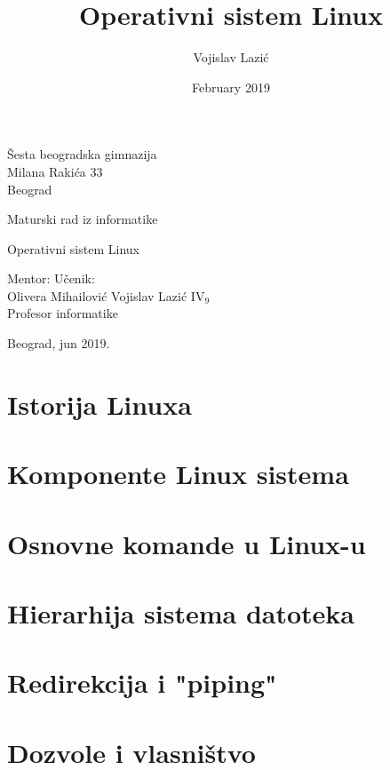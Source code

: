 \documentclass[12pt,twoside,a4paper]{article}
\title{Operativni sistem Linux}
\author{Vojislav Lazić}
\date{February 2019}
\begin{document}
    \thispagestyle{empty}
    \noindent
    Šesta beogradska gimnazija\\
    Milana Rakića 33\\
    Beograd
    \vfill
    \begin{center}
        \begin{Large}
        Maturski rad iz informatike\\
        \bigskip 
        \end{Large}
        {\Huge
        Operativni sistem Linux}
    \end{center}
    \vfill
    \noindent Mentor: \hfill Učenik:\\
    Olivera Mihailović \hfill Vojislav Lazić IV$_{9}$\\
    Profesor informatike
    \vfill
    \begin{center}
        Beograd, jun 2019.
    \end{center}
\thispagestyle{empty}
\newpage
\renewcommand{\contentsname}{Sadržaj}
\tableofcontents
\newpage
\section{Istorija Linuxa}


\section{Komponente Linux sistema}


\section{Osnovne komande u Linux-u}


\section{Hierarhija sistema datoteka}


\section{Redirekcija i "piping"}


\section{Dozvole i vlasništvo}


\nocite{linfo}
\nocite{tldp}
\newpage
\renewcommand\refname{Literatura}


\end{document}
